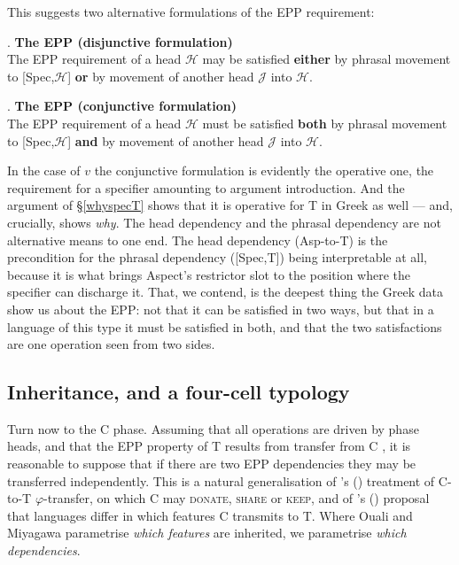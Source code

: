 \documentclass[11pt]{article}
\newcommand{\citeposs}[1]{\citeauthor{#1}'s (\citeyear{#1})}
\begin{document}
This suggests two alternative formulations of the EPP requirement:

\ex. \label{disjunctive}
\textbf{The EPP (disjunctive formulation)}\\
The EPP requirement of a head $\mathcal{H}$ may be satisfied \textbf{either} by phrasal movement to [Spec,$\mathcal{H}$] \textbf{or} by movement of another head $\mathcal{J}$ into $\mathcal{H}$.

\ex. \label{conjunctive}
\textbf{The EPP (conjunctive formulation)}\\
The EPP requirement of a head $\mathcal{H}$ must be satisfied \textbf{both} by phrasal movement to [Spec,$\mathcal{H}$] \textbf{and} by movement of another head $\mathcal{J}$ into $\mathcal{H}$.

\medskip
In the case of $v$ the conjunctive formulation is evidently the operative one, the requirement for a specifier amounting to argument introduction.  And the argument of \S\ref{whyspecT} shows that it is operative for T in Greek as well --- and, crucially, shows \emph{why}.  The head dependency and the phrasal dependency are not alternative means to one end.  The head dependency (Asp-to-T) is the precondition for the phrasal dependency ([Spec,T]) being interpretable at all, because it is what brings Aspect's restrictor slot to the position where the specifier can discharge it.  That, we contend, is the deepest thing the Greek data show us about the EPP: not that it can be satisfied in two ways, but that in a language of this type it must be satisfied in both, and that the two satisfactions are one operation seen from two sides.

\subsection{Inheritance, and a four-cell typology}\label{typology}

Turn now to the C phase.  Assuming that all operations are driven by phase heads, and that the EPP property of T results from transfer from C \citep{chomsky:08, richards:07}, it is reasonable to suppose that if there are two EPP dependencies they may be transferred independently.  This is a natural generalisation of \citeposs{ouali:08} treatment of C-to-T $\varphi$-transfer, on which C may \textsc{donate}, \textsc{share} or \textsc{keep}, and of \citeposs{miyagawa:10, miyagawa:17} proposal that languages differ in which features C transmits to T.  Where Ouali and Miyagawa parametrise \emph{which features} are inherited, we parametrise \emph{which dependencies}.
\end{document}
